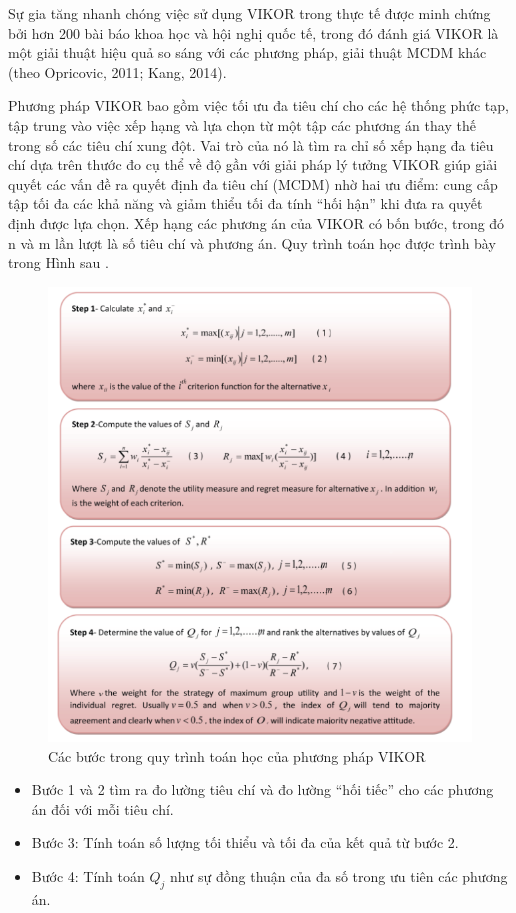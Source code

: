 Sự gia tăng nhanh chóng việc sử dụng VIKOR trong thực tế được minh chứng bởi hơn 200 bài báo khoa học và hội nghị quốc tế, trong đó đánh giá VIKOR là một giải thuật hiệu quả so sáng với các phương pháp, giải thuật MCDM khác (theo Opricovic, 2011; Kang, 2014). 

Phương pháp VIKOR bao gồm việc tối ưu đa tiêu chí cho các hệ thống phức tạp, tập trung vào việc xếp hạng và lựa chọn từ một tập các phương án thay thế trong số các tiêu chí xung đột. Vai trò của nó là tìm ra chỉ số xếp hạng đa tiêu chí dựa trên thước đo cụ thể về độ gần với giải pháp lý tưởng VIKOR giúp giải quyết các vấn đề ra quyết định đa tiêu chí (MCDM) nhờ hai ưu điểm: cung cấp tập tối đa các khả năng và giảm thiểu tối đa tính “hối hận” khi đưa ra quyết định được lựa chọn. Xếp hạng các phương án của VIKOR có bốn bước, trong đó n và m lần lượt là số tiêu chí và phương án. Quy trình toán học được trình bày trong Hình sau \cite{morteza}. 

\begin{figure}[H]
    \centering
    \includegraphics[width=0.85\linewidth]{images/VIKOR.png}
    \vspace{0.5cm}
    \caption{Các bước trong quy trình toán học của phương pháp VIKOR}
\end{figure}

\begin{itemize}
    \item Bước 1 và 2 tìm ra đo lường tiêu chí và đo lường “hối tiếc” cho các phương án đối với mỗi tiêu chí. 
    \item Bước 3: Tính toán số lượng tối thiểu và tối đa của kết quả từ bước 2. 
    \item Bước 4: Tính toán $Q_j$ như sự đồng thuận của đa số trong ưu tiên các phương án.
\end{itemize}

